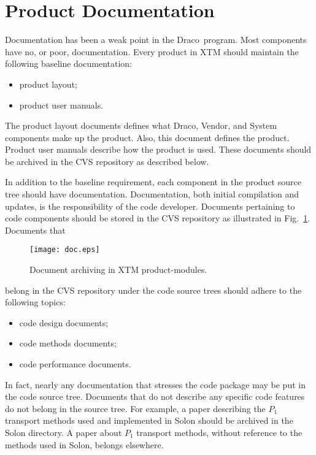\documentclass[11pt]{../tex/rnote}
\newcommand{\draco}{\textsf{Draco}}
\newcommand{\pkg}[1]{\textsf{#1}}
\begin{document}

\section{Product Documentation}
\label{sec:document}

Documentation has been a weak point in the \draco\ program.  Most
components have no, or poor, documentation. Every product in XTM
should maintain the following baseline documentation:
\begin{itemize}
\item product layout;
\item product user manuals.
\end{itemize}
The product layout documents defines what \draco, \pkg{Vendor},
and \pkg{System} components make up the product.  Also, this document
defines the product.  Product user manuals describe how the product
is used.  These documents should be archived in the CVS repository as
described below.

In addition to the baseline requirement, each component in the product
source tree should have documentation.  Documentation, both initial
compilation and updates, is the responsibility of the code developer.
Documents pertaining to code components should be stored in the CVS
repository as illustrated in Fig.~\ref{fig:doc}.  Documents that
\begin{figure}
  \centerline{\texttt{[image: doc.eps]}}
  \caption{Document archiving in XTM product-modules.}
  \label{fig:doc}
\end{figure}
belong in the CVS repository under the code source trees should
adhere to the following topics:
\begin{itemize}
\item code design documents;
\item code methods documents;
\item code performance documents.
\end{itemize}
In fact, nearly any documentation that stresses the code package may
be put in the code source tree.  Documents that do not describe any
specific code features do not belong in the source tree.  For example, 
a paper describing the $P_{1}$ transport methods used and implemented
in \pkg{Solon} should be archived in the \pkg{Solon} directory.  A
paper about $P_{1}$ transport methods, without reference to the
methods used in \pkg{Solon}, belongs elsewhere.
\end{document}
